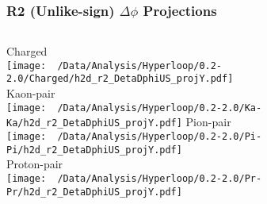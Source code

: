 \documentclass{beamer}
\begin{document}
\begin{frame}
	\frametitle{R2 (Unlike-sign) $\Delta\phi$ Projections}
	\begin{columns}
		\centering
		Charged\\
		\texttt{[image: ~/Data/Analysis/Hyperloop/0.2-2.0/Charged/h2d\_r2\_DetaDphiUS\_projY.pdf]}\\Kaon-pair\\
		\texttt{[image: ~/Data/Analysis/Hyperloop/0.2-2.0/Ka-Ka/h2d\_r2\_DetaDphiUS\_projY.pdf]}
		\centering
		Pion-pair\\
		\texttt{[image: ~/Data/Analysis/Hyperloop/0.2-2.0/Pi-Pi/h2d\_r2\_DetaDphiUS\_projY.pdf]}\\Proton-pair\\
		\texttt{[image: ~/Data/Analysis/Hyperloop/0.2-2.0/Pr-Pr/h2d\_r2\_DetaDphiUS\_projY.pdf]}
	\end{columns}
\end{frame}
\end{document}
